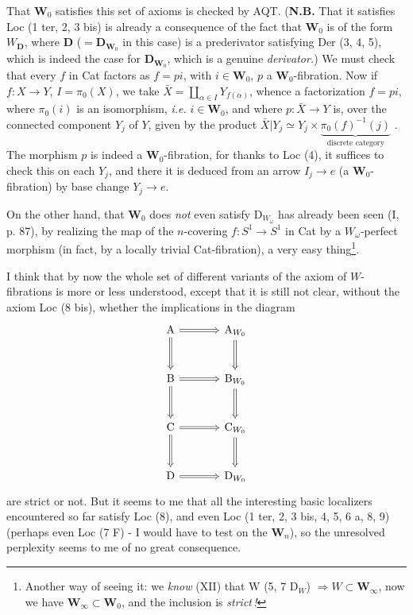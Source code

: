 \documentclass[11pt]{article}
\newcommand{\printedpage}[1]{\marginpar{\footnotesize p.~#1}}
\newcommand{\msp}[1]{\marginpar{\footnotesize [#1]}}
\begin{document}
\printedpage{39}

\msp{page 69}
That $\mathbf{W}_0$ satisfies this set of axioms is checked by AQT. (\textbf{N.B.} That it satisfies Loc (1 ter, 2, 3 bis) is already a consequence of the fact that $\mathbf{W}_0$ is of the form $W_{\mathbf{D}}$, where $\mathbf{D}$ ($=\mathbf{D}_{\mathbf{W}_0}$ in this case) is a prederivator satisfying Der (3, 4, 5), which is indeed the case for $\mathbf{D}_{\mathbf{W}_0}$, which is a genuine \textit{derivator.}) We must check that every $f$ in Cat factors as $f = pi$, with $i \in \mathbf{W}_0$, $p$ a $\mathbf{W}_0$-fibration. Now if $f : X \longrightarrow Y$, $I = \pi_0(X)$, we take $\bar{X} = \coprod_{\alpha\in I} Y_{f(\alpha)}$, whence a factorization $f = pi$, where $\pi_0(i)$ is an isomorphism, \textit{i.e.} $i \in \mathbf{W}_0$, and where $p : \bar{X} \longrightarrow Y$ is, over the connected component $Y_j$ of $Y$, given by the product $\bar{X}|Y_j \simeq Y_j \times \underbrace{\pi_0(f)^{-1}(j)}_{\text{discrete category}}$ . The morphism $p$ is indeed a $\mathbf{W}_0$-fibration, for thanks to Loc (4), it suffices to check this on each $Y_j$, and there it is deduced from an arrow $I_j \longrightarrow e$ (a $\mathbf{W}_0$-fibration) by base change $Y_j \longrightarrow e$.

On the other hand, that $\mathbf{W}_0$ does \textit{not} even satisfy $\mathrm{D}_{W_\omega}$ has already been seen (I, p. 87),
\msp{page 70}
by realizing the map of the $n$-covering $f : S^1 \longrightarrow S^1$ in Cat by a $W_\omega$-perfect morphism (in fact, by a locally trivial Cat-fibration), a very easy thing\footnote[37]{Another way of seeing it: we \textit{know} (XII) that $\mathrm{W}$ (5, 7 $\mathrm{D}_W$) $\Longrightarrow W \subset \mathbf{W}_\infty$, now we have $\mathbf{W}_\infty \subset \mathbf{W}_0$, and the inclusion is \textit{strict\,!}}.

I think that by now the whole set of different variants of the axiom of $W$-fibrations is more or less understood, except that it is still not clear, without the axiom Loc (8 bis), whether the implications in the diagram
\[
\begin{tikzcd}[row sep=large, column sep=large]
\mathrm{A} \arrow[r, Rightarrow] \arrow[d, Rightarrow] & \mathrm{A}_{W_0} \arrow[d, Rightarrow] \\
\mathrm{B} \arrow[r, Rightarrow] \arrow[d, Rightarrow] & \mathrm{B}_{W_0} \arrow[d, Rightarrow] \\
\mathrm{C} \arrow[r, Rightarrow] \arrow[d, Rightarrow] & \mathrm{C}_{W_0} \arrow[d, Rightarrow] \\
\mathrm{D} \arrow[r, Rightarrow] & \mathrm{D}_{W_0}
\end{tikzcd}
\]
are strict or not. But it seems to me that all the interesting basic localizers encountered so far satisfy Loc (8), and even Loc (1 ter, 2, 3 bis, 4, 5, 6 a, 8, 9) (perhaps even Loc (7 F) - I would have to test on the $\mathbf{W}_n$), so the unresolved perplexity seems to me of no great consequence. %
\end{document}
